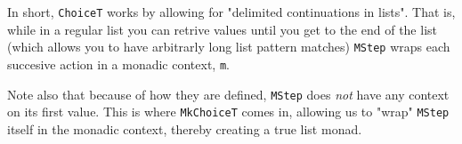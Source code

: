 In short, \verb|ChoiceT| works by allowing for "delimited continuations in lists".
That is, while in a regular list you can retrive values until you get to the end of the list (which allows you to have arbitrarly long list pattern matches) \verb|MStep| wraps each succesive action in a monadic context, \verb|m|.

Note also that because of how they are defined, \verb|MStep| does \emph{not} have any context on its first value.
This is where \verb|MkChoiceT| comes in, allowing us to "wrap" \verb|MStep| itself in the monadic context, thereby creating a true list monad.

	